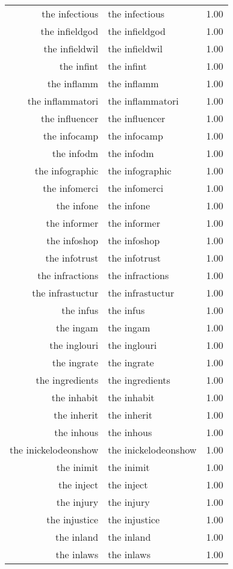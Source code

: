 \begin{table}[ht]
\begin{tabular}{rlr}
  the infectious & the infectious & 1.00 \\ 
  the infieldgod & the infieldgod & 1.00 \\ 
  the infieldwil & the infieldwil & 1.00 \\ 
  the infint & the infint & 1.00 \\ 
  the inflamm & the inflamm & 1.00 \\ 
  the inflammatori & the inflammatori & 1.00 \\ 
  the influencer & the influencer & 1.00 \\ 
  the infocamp & the infocamp & 1.00 \\ 
  the infodm & the infodm & 1.00 \\ 
  the infographic & the infographic & 1.00 \\ 
  the infomerci & the infomerci & 1.00 \\ 
  the infone & the infone & 1.00 \\ 
  the informer & the informer & 1.00 \\ 
  the infoshop & the infoshop & 1.00 \\ 
  the infotrust & the infotrust & 1.00 \\ 
  the infractions & the infractions & 1.00 \\ 
  the infrastuctur & the infrastuctur & 1.00 \\ 
  the infus & the infus & 1.00 \\ 
  the ingam & the ingam & 1.00 \\ 
  the inglouri & the inglouri & 1.00 \\ 
  the ingrate & the ingrate & 1.00 \\ 
  the ingredients & the ingredients & 1.00 \\ 
  the inhabit & the inhabit & 1.00 \\ 
  the inherit & the inherit & 1.00 \\ 
  the inhous & the inhous & 1.00 \\ 
  the inickelodeonshow & the inickelodeonshow & 1.00 \\ 
  the inimit & the inimit & 1.00 \\ 
  the inject & the inject & 1.00 \\ 
  the injury & the injury & 1.00 \\ 
  the injustice & the injustice & 1.00 \\ 
  the inland & the inland & 1.00 \\ 
  the inlaws & the inlaws & 1.00 \\ 

\end{tabular}
\end{table}
